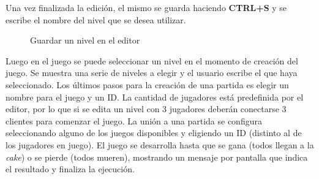 \documentclass[a4paper]{article}
\begin{document}
\newpage

Una vez finalizada la edición, el mismo se guarda haciendo \textbf{CTRL+S} y se escribe el nombre del nivel que se desea utilizar.

\begin{figure}[!h]
	\caption{Guardar un nivel en el editor}
	\label{fig:diagrama23}
\end{figure}

Luego en el juego se puede seleccionar un nivel en el momento de creación del juego. Se muestra una serie de niveles a elegir y el usuario escribe el que haya seleccionado. Los últimos pasos para la creación de una partida es elegir un nombre para el juego y un ID. La cantidad de jugadores está predefinida por el editor, por lo que si se edita un nivel con 3 jugadores deberán conectarse 3 clientes para comenzar el juego. La unión a una partida se configura seleccionando alguno de los juegos disponibles y eligiendo un ID (distinto al de los jugadores en juego). El juego se desarrolla hasta que se gana (todos llegan a la \textit{cake}) o se pierde (todos mueren), mostrando un mensaje por pantalla que indica el resultado y finaliza la ejecución.
\end{document}
